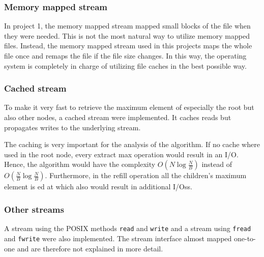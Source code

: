 

\subsubsection{Memory mapped stream}

In project 1, the memory mapped stream mapped small blocks of the file when they were needed. This is not the most natural way to utilize memory mapped files. Instead, the memory mapped stream used in this projects maps the whole file once and remaps the file if the file size changes. In this way, the operating system is completely in charge of utilizing file caches in the best possible way.


\subsubsection{Cached stream}

To make it very fast to retrieve the maximum element of especially the root but also other nodes, a cached stream were implemented. It caches reads but propagates writes to the underlying stream.

The caching is very important for the analysis of the algorithm. If no cache where used in the root node, every extract max operation would result in an I/O. Hence, the algorithm would have the complexity $O(N\log \frac{N}{B})$ instead of $O(\frac{N}{B}\log \frac{N}{B})$. Furthermore, in the refill operation all the children's maximum element is ed at which also would result in additional I/Oss.

\subsubsection{Other streams}

A stream using the POSIX methods \texttt{read} and \texttt{write} and a stream using \texttt{fread} and \texttt{fwrite} were also implemented. The stream interface almost mapped one-to-one and are therefore not explained in more detail.

